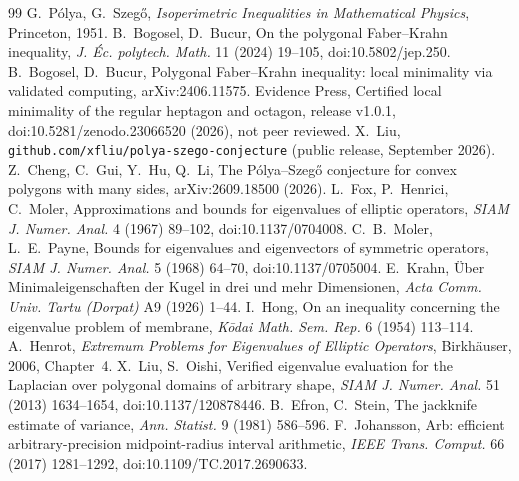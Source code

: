 \documentclass[11pt]{article}
\theoremstyle{remark}
\begin{document}
\begin{thebibliography}{99}
 G.~P\'olya, G.~Szeg\H{o}, \emph{Isoperimetric Inequalities in Mathematical Physics}, Princeton, 1951.
 B.~Bogosel, D.~Bucur, On the polygonal Faber--Krahn inequality, \emph{J. \'Ec. polytech. Math.} 11 (2024) 19--105, doi:10.5802/jep.250.
 B.~Bogosel, D.~Bucur, Polygonal Faber--Krahn inequality: local minimality via validated computing, arXiv:2406.11575.
 Evidence Press, Certified local minimality of the regular heptagon and octagon, release v1.0.1, doi:10.5281/zenodo.23066520 (2026), not peer reviewed.
 X.~Liu, \texttt{github.com/xfliu/polya-szego-conjecture} (public release, September 2026).
 Z.~Cheng, C.~Gui, Y.~Hu, Q.~Li, The P\'olya--Szeg\H{o} conjecture for convex polygons with many sides, arXiv:2609.18500 (2026).
 L.~Fox, P.~Henrici, C.~Moler, Approximations and bounds for eigenvalues of elliptic operators, \emph{SIAM J. Numer. Anal.} 4 (1967) 89--102, doi:10.1137/0704008.
 C.~B.~Moler, L.~E.~Payne, Bounds for eigenvalues and eigenvectors of symmetric operators, \emph{SIAM J. Numer. Anal.} 5 (1968) 64--70, doi:10.1137/0705004.
 E.~Krahn, \"Uber Minimaleigenschaften der Kugel in drei und mehr Dimensionen, \emph{Acta Comm. Univ. Tartu (Dorpat)} A9 (1926) 1--44.
 I.~Hong, On an inequality concerning the eigenvalue problem of membrane, \emph{K\={o}dai Math. Sem. Rep.} 6 (1954) 113--114.
 A.~Henrot, \emph{Extremum Problems for Eigenvalues of Elliptic Operators}, Birkh\"auser, 2006, Chapter~4.
 X.~Liu, S.~Oishi, Verified eigenvalue evaluation for the Laplacian over polygonal domains of arbitrary shape, \emph{SIAM J. Numer. Anal.} 51 (2013) 1634--1654, doi:10.1137/120878446.
 B.~Efron, C.~Stein, The jackknife estimate of variance, \emph{Ann. Statist.} 9 (1981) 586--596.
 F.~Johansson, Arb: efficient arbitrary-precision midpoint-radius interval arithmetic, \emph{IEEE Trans. Comput.} 66 (2017) 1281--1292, doi:10.1109/TC.2017.2690633.
\end{thebibliography}
\end{document}
